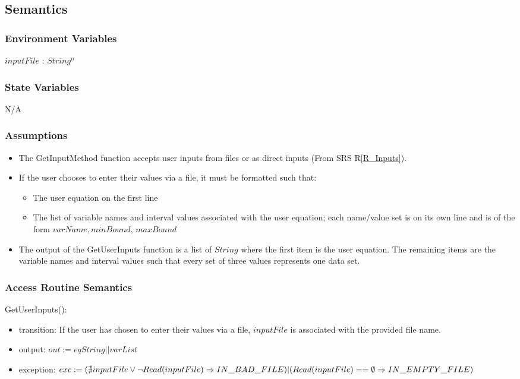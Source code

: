 \documentclass[12pt, titlepage]{article}
\newcommand{\rref}[1]{R\ref{#1}}
\begin{document}
\subsection{Semantics}

\subsubsection{Environment Variables}

$inputFile$ : $String^n$

\subsubsection{State Variables}

N/A

\subsubsection{Assumptions}

\begin{itemize}
	\item The GetInputMethod function accepts user inputs from files or as 
	direct inputs (From SRS \rref{R_Inputs}).
	
	\item If the user chooses to enter their values via a file, it must be 
	formatted such that:	
	\begin{itemize}
		\item The user equation on the first line
		\item The list of variable names and interval values associated with 
		the user equation; each name/value set is on its own line and is of the 
		form $varName, minBound$, $maxBound$
	\end{itemize}

	\item The output of the GetUserInputs function is a list of $String$ where 
	the first item is the user equation. The remaining items are the variable 
	names and interval values such that every set of three values represents 
	one data set. 
\end{itemize}


\subsubsection{Access Routine Semantics}

\noindent GetUserInputs():
\begin{itemize}
	\item transition: If the user has chosen to enter their values via a file, 
	$inputFile$ is associated with the provided file name.
	\item output: $out := eqString || varList$
	\item exception: $exc := \\
	(\nexists inputFile \vee \neg Read(inputFile) \Rightarrow IN\_BAD\_FILE)\\
	|\\
	(Read(inputFile) == \emptyset \Rightarrow IN\_EMPTY\_FILE)$
\end{itemize}
\end{document}
